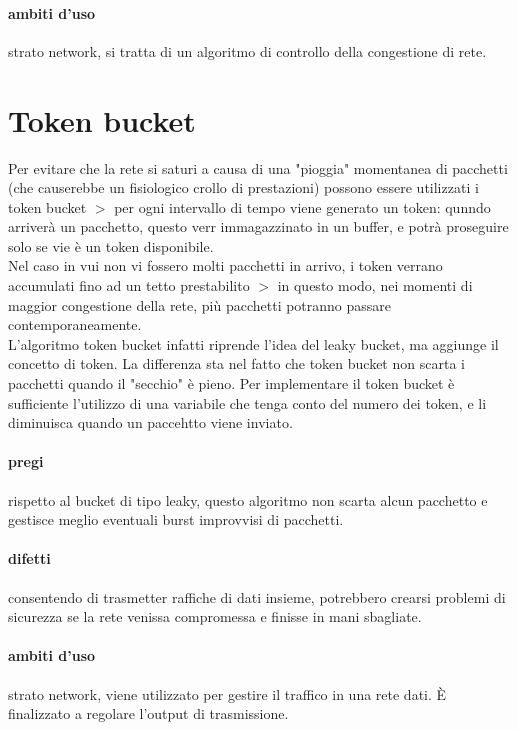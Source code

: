 \documentclass{article}
\begin{document}
\paragraph{ambiti d'uso} strato network, si tratta di un algoritmo di controllo
della congestione di rete.

\section{Token bucket}

Per evitare che la rete si saturi a causa di una "pioggia" momentanea di
pacchetti (che causerebbe un fisiologico crollo di prestazioni) possono essere
utilizzati i token bucket $>$ per ogni intervallo di tempo viene generato un
token: qunndo arriverà un pacchetto, questo verr immagazzinato in un buffer, e
potrà proseguire solo se vie è un token disponibile.\\
Nel caso in vui non vi fossero molti pacchetti in arrivo, i token verrano
accumulati fino ad un tetto prestabilito $>$ in questo modo, nei momenti di
maggior congestione della rete, più pacchetti potranno passare
contemporaneamente.\\
L'algoritmo token bucket infatti riprende l'idea del leaky bucket, ma aggiunge
il concetto di token. La differenza sta nel fatto che token bucket non scarta i
pacchetti quando il "secchio" è pieno. Per implementare il token bucket è
sufficiente l'utilizzo di una variabile che tenga conto del numero dei token, e
li diminuisca quando un paccehtto viene inviato.

\paragraph{pregi} rispetto al bucket di tipo leaky, questo algoritmo non scarta
alcun pacchetto e gestisce meglio eventuali burst improvvisi di pacchetti.

\paragraph{difetti} consentendo di trasmetter raffiche di dati insieme,
potrebbero crearsi problemi di sicurezza se la rete venissa compromessa e
finisse in mani sbagliate.

\paragraph{ambiti d'uso} strato network, viene utilizzato per gestire il
traffico in una rete dati. È finalizzato a regolare l'output di trasmissione.
\end{document}
